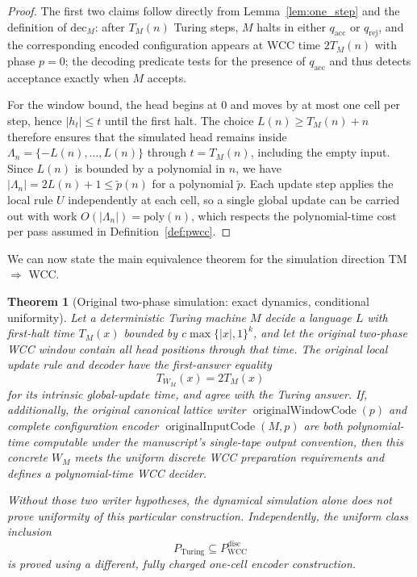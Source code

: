 \documentclass[12pt]{article}
\newtheorem{theorem}{Theorem}[section]
\begin{document}
\begin{proof}
The first two claims follow directly from Lemma~\ref{lem:one_step} and the
definition of $\mathrm{dec}_M$: after $T_M(n)$ Turing steps, $M$ halts in either
$q_{\mathrm{acc}}$ or $q_{\mathrm{rej}}$, and the corresponding encoded
configuration appears at WCC time $2T_M(n)$ with phase $p=0$; the decoding
predicate tests for the presence of $q_{\mathrm{acc}}$ and thus detects
acceptance exactly when $M$ accepts.

For the window bound, the head begins at $0$ and moves by at most
one cell per step, hence $|h_t|\le t$ until the first halt.
The choice $L(n)\ge T_M(n)+n$ therefore ensures that the simulated
head remains inside $\Lambda_n=\{-L(n),\dots,L(n)\}$ through
$t=T_M(n)$, including the empty input. Since $L(n)$ is bounded by
a polynomial in $n$, we have
$|\Lambda_n| = 2L(n)+1 \le \tilde{p}(n)$ for a polynomial $\tilde{p}$. Each
update step applies the local rule $U$ independently at each cell, so a single
global update can be carried out with work $O(|\Lambda_n|) =
\mathrm{poly}(n)$, which respects the polynomial-time cost per pass assumed in
Definition~\ref{def:pwcc}.
\end{proof}

We can now state the main equivalence theorem for the simulation direction
TM $\Rightarrow$ WCC.

\begin{theorem}[Original two-phase simulation: exact dynamics, conditional uniformity]
\label{thm:tm_to_wcc}
Let a deterministic Turing machine $M$ decide a language $L$
with first-halt time $T_M(x)$ bounded by
$c\max\{|x|,1\}^k$, and let the original
two-phase WCC window contain all head positions through that
time.  The original local update rule and decoder have
the first-answer equality
\[
T_{W_M}(x)=2T_M(x)
\]
for its \emph{intrinsic global-update time}, and agree with the
Turing answer.  If, additionally, the
\emph{original} canonical lattice writer
$\operatorname{originalWindowCode}(p)$ and complete
configuration encoder
$\operatorname{originalInputCode}(M,p)$ are both
polynomial-time computable under the manuscript's
single-tape output convention, then this concrete
$W_M$ meets the uniform discrete WCC preparation
requirements and defines a polynomial-time WCC decider.

Without those two writer hypotheses, the dynamical
simulation alone does \emph{not} prove uniformity
of this particular construction.  Independently, the
uniform class inclusion
\[
P_{\mathrm{Turing}}\subseteq
P_{\mathrm{WCC}}^{\mathrm{disc}}
\]
is proved using a different, fully charged
one-cell encoder construction.
\end{theorem}
\end{document}
